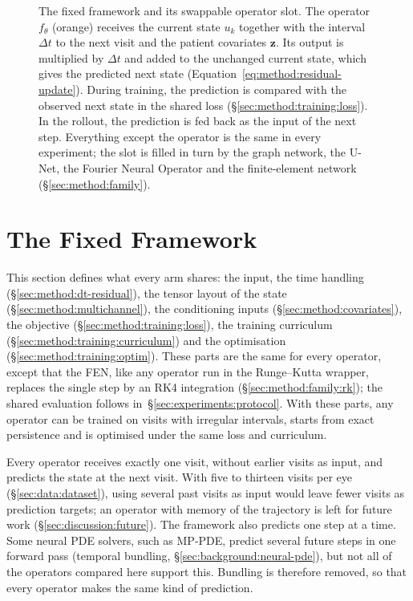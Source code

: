\begin{figure}[t]
  \centering
  
  \caption[The fixed framework and its swappable operator slot.]{%
    The fixed framework and its swappable operator slot. The operator
    $f_\theta$ (orange) receives the current state $u_k$ together with the
    interval $\Delta t$ to the next visit and the patient covariates
    $\mathbf{z}$. Its output is multiplied by $\Delta t$ and added to the
    unchanged current state, which gives the predicted next state
    (Equation~\ref{eq:method:residual-update}). During training, the
    prediction is compared with the observed next state in the shared loss
    (\S\ref{sec:method:training:loss}). In the rollout, the prediction is
    fed back as the input of the next step. Everything except
    the operator is the same in every experiment; the slot is filled in
    turn by the graph network, the U-Net, the Fourier Neural Operator and
    the finite-element network (\S\ref{sec:method:family}).}
  \label{fig:method:pipeline}
\end{figure}


\section{The Fixed Framework}
\label{sec:method:framework}

This section defines what every arm shares: the input, the time handling
(\S\ref{sec:method:dt-residual}), the tensor layout of the state
(\S\ref{sec:method:multichannel}), the conditioning inputs
(\S\ref{sec:method:covariates}), the objective
(\S\ref{sec:method:training:loss}), the training curriculum
(\S\ref{sec:method:training:curriculum}) and the optimisation
(\S\ref{sec:method:training:optim}). These parts are the same for every
operator, except that the FEN, like any operator run in the Runge--Kutta
wrapper, replaces the single step by an RK4 integration
(\S\ref{sec:method:family:rk}); the shared evaluation follows
in~\S\ref{sec:experiments:protocol}. With these parts, any operator can
be trained on visits with irregular intervals, starts from exact
persistence and is optimised under the same loss and curriculum.

Every operator receives exactly one visit, without earlier visits as
input, and predicts the state at the next visit. With five to thirteen
visits per eye (\S\ref{sec:data:dataset}), using several past visits as
input would leave fewer visits as prediction targets; an operator with
memory of the trajectory is left for future work
(\S\ref{sec:discussion:future}). The framework also predicts one step at a
time. Some neural PDE solvers, such
as MP-PDE, predict several future steps in one forward pass (temporal
bundling, \S\ref{sec:background:neural-pde}), but not all of the operators
compared here support this. Bundling is therefore removed, so that every
operator makes the same kind of prediction.

